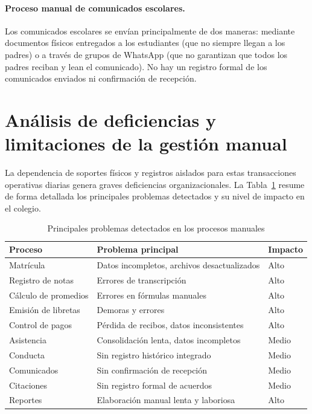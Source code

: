 \documentclass[12pt,a4paper,oneside]{report}
\begin{document}
\paragraph{Proceso manual de comunicados escolares.} Los comunicados escolares se envían principalmente de dos maneras: mediante documentos físicos entregados a los estudiantes (que no siempre llegan a los padres) o a través de grupos de WhatsApp (que no garantizan que todos los padres reciban y lean el comunicado). No hay un registro formal de los comunicados enviados ni confirmación de recepción.

\section{Análisis de deficiencias y limitaciones de la gestión manual}

La dependencia de soportes físicos y registros aislados para estas transacciones operativas diarias genera graves deficiencias organizacionales. La Tabla~\ref{tab:problemas} resume de forma detallada los principales problemas detectados y su nivel de impacto en el colegio.

\begin{table}[H]
\centering
\caption{Principales problemas detectados en los procesos manuales}
\label{tab:problemas}
\begin{tabularx}{\textwidth}{lXl}
\toprule
Proceso & Problema principal & Impacto \\
\midrule
Matrícula & Datos incompletos, archivos desactualizados & Alto \\
Registro de notas & Errores de transcripción & Alto \\
Cálculo de promedios & Errores en fórmulas manuales & Alto \\
Emisión de libretas & Demoras y errores & Alto \\
Control de pagos & Pérdida de recibos, datos inconsistentes & Alto \\
Asistencia & Consolidación lenta, datos incompletos & Medio \\
Conducta & Sin registro histórico integrado & Medio \\
Comunicados & Sin confirmación de recepción & Medio \\
Citaciones & Sin registro formal de acuerdos & Medio \\
Reportes & Elaboración manual lenta y laboriosa & Alto \\
\bottomrule
\end{tabularx}
\end{table}
\end{document}
